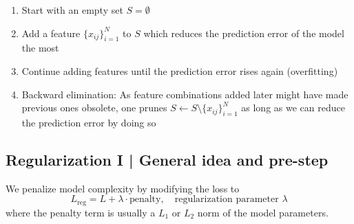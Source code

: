 \begin{enumerate}
    \item Start with an empty set $S = \emptyset$
    \item Add a feature $\{ x_{ij} \}_{i=1}^N$ to $S$ which reduces the prediction error of the model the most
    \item Continue adding features until the prediction error rises again (overfitting)
    \item Backward elimination: As feature combinations added later might have made previous ones obsolete,
          one prunes $S \leftarrow S \setminus \{ x_{ij} \}_{i=1}^N$ as long as we can reduce the prediction error by doing so
\end{enumerate}

\subsection{Regularization I | General idea and pre-step}
We penalize model complexity by modifying the loss to
\begin{equation}
    L_{\text{reg}} = L + \lambda \cdot \text{penalty}, \quad \text{regularization parameter } \lambda 
\end{equation}
where the penalty term is usually a $L_1$ or $L_2$ norm of the model parameters.
